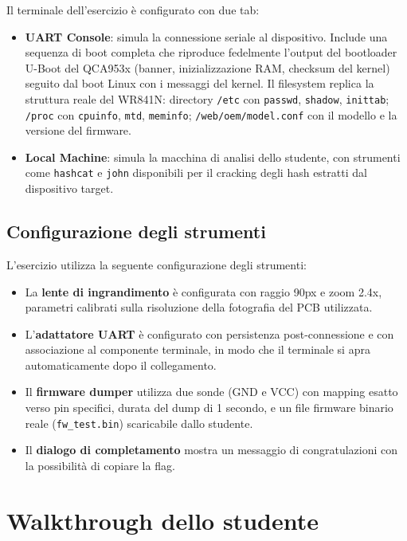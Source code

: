 Il terminale dell'esercizio è configurato con due tab:

\begin{itemize}
    \item \textbf{UART Console}: simula la connessione seriale al dispositivo. Include una sequenza di boot completa che riproduce fedelmente l'output del bootloader U-Boot del QCA953x (banner, inizializzazione RAM, checksum del kernel) seguito dal boot Linux con i messaggi del kernel. Il filesystem replica la struttura reale del WR841N: directory \texttt{/etc} con \texttt{passwd}, \texttt{shadow}, \texttt{inittab}; \texttt{/proc} con \texttt{cpuinfo}, \texttt{mtd}, \texttt{meminfo}; \texttt{/web/oem/model.conf} con il modello e la versione del firmware.

    \item \textbf{Local Machine}: simula la macchina di analisi dello studente, con strumenti come \texttt{hashcat} e \texttt{john} disponibili per il cracking degli hash estratti dal dispositivo target.
\end{itemize}

\subsection{Configurazione degli strumenti}
\label{subsec:configurazione-strumenti}

L'esercizio utilizza la seguente configurazione degli strumenti:

\begin{itemize}
    \item La \textbf{lente di ingrandimento} è configurata con raggio 90px e zoom 2.4x, parametri calibrati sulla risoluzione della fotografia del PCB utilizzata.
    \item L'\textbf{adattatore UART} è configurato con persistenza post-connessione e con associazione al componente terminale, in modo che il terminale si apra automaticamente dopo il collegamento.
    \item Il \textbf{firmware dumper} utilizza due sonde (GND e VCC) con mapping esatto verso pin specifici, durata del dump di 1 secondo, e un file firmware binario reale (\texttt{fw\_test.bin}) scaricabile dallo studente.
    \item Il \textbf{dialogo di completamento} mostra un messaggio di congratulazioni con la possibilità di copiare la flag.
\end{itemize}


\section{Walkthrough dello studente}
\label{sec:walkthrough-studente}

